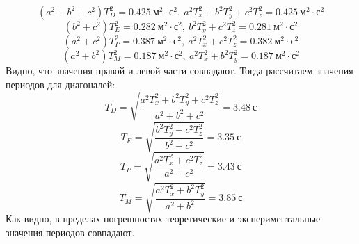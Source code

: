 \documentclass[a4paper,12pt]{article}
\begin{document}
\begin{enumerate}
    $$
    (a^2+b^2+c^2)T^2_{D} = 0.425~\text{м$^2\cdot$с$^2$},~a^2 T^2_{x}+b^2 T^2_{y}+c^2 T^2_{z} = 0.425~\text{м$^2\cdot$с$^2$}
    $$
    $$
    (b^2+c^2)T^2_{E} = 0.282~\text{м$^2\cdot$с$^2$},~b^2 T^2_{y}+c^2 T^2_{z} = 0.281~\text{м$^2\cdot$с$^2$}
    $$
    $$
    (a^2+c^2)T^2_{P} = 0.387~\text{м$^2\cdot$с$^2$},~a^2 T^2_{x}+c^2 T^2_{z} = 0.382~\text{м$^2\cdot$с$^2$}
    $$
    $$
    (a^2+b^2)T^2_{M} = 0.187~\text{м$^2\cdot$с$^2$},~a^2 T^2_{x}+b^2 T^2_{y} = 0.187~\text{м$^2\cdot$с$^2$}
    $$
    Видно, что значения правой и левой части совпадают. Тогда рассчитаем значения периодов для диагоналей:
    $$
    T_D = \sqrt{\frac{a^2 T^2_{x}+b^2 T^2_{y}+c^2 T^2_{z}}{a^2+b^2+c^2}} = 3.48~\text{с}
    $$
    $$
    T_E = \sqrt{\frac{b^2 T^2_{y}+c^2 T^2_{z}}{b^2+c^2}} = 3.35~\text{с}
    $$
    $$
    T_P = \sqrt{\frac{a^2 T^2_{x}+c^2 T^2_{z}}{a^2+c^2}} = 3.43~\text{с}
    $$
    $$
    T_M = \sqrt{\frac{a^2 T^2_{x}+b^2 T^2_{y}}{a^2+b^2}} = 3.85~\text{с}
    $$
    Как видно, в пределах погрешностях теоретические и экспериментальные значения периодов совпадают.
    

\end{enumerate}
\end{document}
